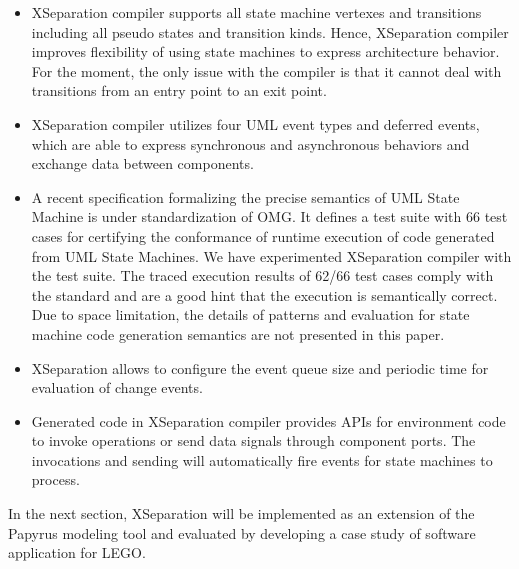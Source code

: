 \begin{itemize}[\footnotesize]
	\item {} XSeparation compiler supports all state machine vertexes and transitions including all pseudo states and transition kinds. 
	Hence, XSeparation compiler improves flexibility of using state machines to express architecture behavior.
	For the moment, the only issue with the compiler is that it cannot deal with transitions from an entry point to an exit point.
	
	\item {} XSeparation compiler utilizes four UML event types and deferred events, which are able to express synchronous and asynchronous behaviors and exchange data between components.
	
	\item {} A recent specification formalizing the precise semantics of UML State Machine is under standardization of OMG.
	It defines a test suite with 66 test cases for certifying the conformance of runtime execution of code generated from UML State Machines.
	We have experimented XSeparation compiler with the test suite.
	The traced execution results of 62/66 test cases comply with the standard and are a good hint that the execution is semantically correct.
	Due to space limitation, the details of patterns and evaluation for state machine code generation semantics are not presented in this paper.
	
	\item {} XSeparation allows to configure the event queue size and periodic time for evaluation of change events.
	
	\item {} Generated code in XSeparation compiler provides APIs for environment code to invoke operations or send data signals through component ports.
	The invocations and sending will automatically fire events for state machines to process.
\end{itemize}


In the next section, XSeparation will be implemented as an extension of the Papyrus modeling tool and evaluated by developing a case study of software application for LEGO.